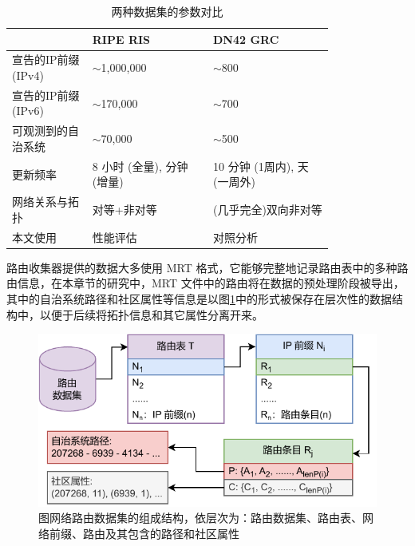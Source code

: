 \begin{table}
    \caption{两种数据集的参数对比}
    \begin{tabular}{p{0.2\linewidth}p{0.3\linewidth}p{0.3\linewidth}}
        \toprule
                       & \textbf{RIPE RIS}                                & \textbf{DN42 GRC}              \\
        \midrule
        宣告的IP前缀 \newline(IPv4) & $\sim$1,000,000                                  & $\sim$800                      \\
        宣告的IP前缀 \newline(IPv6) & $\sim$170,000                                    & $\sim$700                      \\
        可观测到的自治系统      & $\sim$70,000                                     & $\sim$500                      \\
        更新频率           & 8 小时 (全量),                     \newline5 分钟 (增量) & 10 分钟 (1周内), \newline1 天 (一周外) \\
        网络关系与拓扑        & 对等+非对等                                           & (几乎完全)双向非对等                    \\
        \midrule
        本文使用           & 性能评估                                             & 对照分析                           \\
        \bottomrule
    \end{tabular}
    \label{dataset-compare}
\end{table}

路由收集器提供的数据大多使用 MRT 格式，它能够完整地记录路由表中的多种路由信息，在本章节的研究中，MRT 文件中的路由将在数据的预处理阶段被导出，其中的自治系统路径和社区属性等信息是以图\ref{c3_data-struct}中的形式被保存在层次性的数据结构中，以便于后续将拓扑信息和其它属性分离开来。

\begin{figure}[h]
    \includegraphics[width=0.7\linewidth]{chapter/c3_images/c3_data-struct.pdf}
    \caption{图网络路由数据集的组成结构，依层次为：路由数据集、路由表、网络前缀、路由及其包含的路径和社区属性}
    \label{c3_data-struct}
\end{figure}

